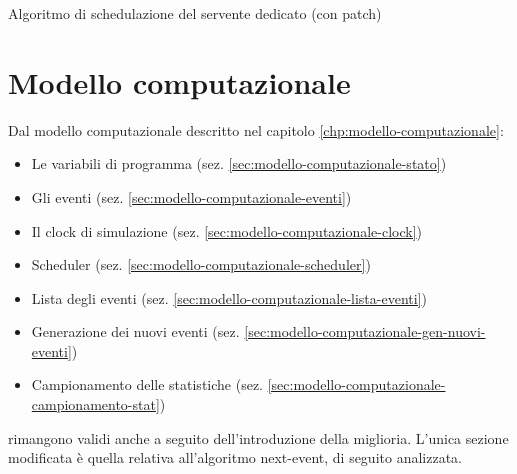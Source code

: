 \begin{algorithm}
\SetAlgoLined
{}
\caption{Algoritmo di schedulazione del servente dedicato (con {\color{purple}patch})}
\label{alg:miglioria-modello-specifiche-2}
\end{algorithm}

\section{Modello computazionale}\label{sec:miglioria-modello-computazionale}
Dal modello computazionale descritto nel capitolo \ref{chp:modello-computazionale}:
\begin{itemize}
\item Le variabili di programma (sez. \ref{sec:modello-computazionale-stato})
\item Gli eventi (sez. \ref{sec:modello-computazionale-eventi})
\item Il clock di simulazione (sez. \ref{sec:modello-computazionale-clock})
\item Scheduler (sez. \ref{sec:modello-computazionale-scheduler})
\item Lista degli eventi (sez. \ref{sec:modello-computazionale-lista-eventi})
\item Generazione dei nuovi eventi (sez. \ref{sec:modello-computazionale-gen-nuovi-eventi})
\item Campionamento delle statistiche (sez. \ref{sec:modello-computazionale-campionamento-stat})
\end{itemize}
rimangono validi anche a seguito dell'introduzione della miglioria. L'unica sezione modificata è quella relativa all'algoritmo next-event, di seguito analizzata.


